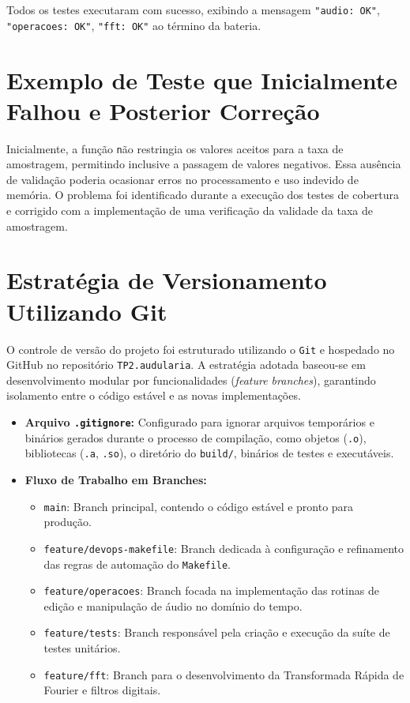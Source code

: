 \documentclass[12pt, a4paper]{article}
\begin{document}
Todos os testes executaram com sucesso, exibindo a mensagem \texttt{"audio: OK"}, \texttt{"operacoes: OK"}, \texttt{"fft: OK"} ao término da bateria.

\section{Exemplo de Teste que Inicialmente Falhou e Posterior Correção}
Inicialmente, a função \texttt não restringia os valores aceitos para a taxa de amostragem, permitindo inclusive a passagem de valores negativos. Essa ausência de validação poderia ocasionar erros no processamento e uso indevido de memória. O problema foi identificado durante a execução dos testes de cobertura e corrigido com a implementação de uma verificação da validade da taxa de amostragem.

\section{Estratégia de Versionamento Utilizando Git}
O controle de versão do projeto foi estruturado utilizando o \texttt{Git} e hospedado no GitHub no repositório \texttt{TP2.audularia}. A estratégia adotada baseou-se em desenvolvimento modular por funcionalidades (\emph{feature branches}), garantindo isolamento entre o código estável e as novas implementações.

\begin{itemize}
    \item \textbf{Arquivo \texttt{.gitignore}:} Configurado para ignorar arquivos temporários e binários gerados durante o processo de compilação, como objetos (\texttt{.o}), bibliotecas (\texttt{.a}, \texttt{.so}), o diretório do \texttt{build/}, binários de testes e executáveis.
    \item \textbf{Fluxo de Trabalho em Branches:}
    \begin{itemize}
        \item \texttt{main}: Branch principal, contendo o código estável e pronto para produção.
        \item \texttt{feature/devops-makefile}: Branch dedicada à configuração e refinamento das regras de automação do \texttt{Makefile}.
        \item \texttt{feature/operacoes}: Branch focada na implementação das rotinas de edição e manipulação de áudio no domínio do tempo.
        \item \texttt{feature/tests}: Branch responsável pela criação e execução da suíte de testes unitários.
        \item \texttt{feature/fft}: Branch para o desenvolvimento da Transformada Rápida de Fourier e filtros digitais.
    \end{itemize}
\end{itemize}
\end{document}
